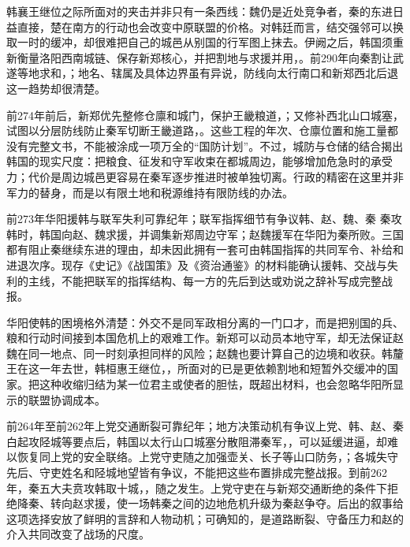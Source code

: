 韩襄王继位之际所面对的夹击并非只有一条西线：魏仍是近处竞争者，秦的东进日益直接，楚在南方的行动也会改变中原联盟的价格。对韩廷而言，结交强邻可以换取一时的缓冲，却很难把自己的城邑从别国的行军图上抹去。伊阙之后，韩国须重新衡量洛阳西南城链、保存新郑核心，并把割地与求援并用，。前290年向秦割让武遂等地求和，；地名、辖属及具体边界虽有异说，防线向太行南口和新郑西北后退这一趋势却很清楚。

前274年前后，新郑优先整修仓廪和城门，保护王畿粮道，；又修补西北山口城塞，试图以分层防线防止秦军切断王畿道路，。这些工程的年次、仓廪位置和施工量都没有完整文书，不能被涂成一项万全的“国防计划”。不过，城防与仓储的结合揭出韩国的现实尺度：把粮食、征发和守军收束在都城周边，能够增加危急时的承受力；代价是周边城邑更容易在秦军逐步推进时被单独切离。行政的精密在这里并非军力的替身，而是以有限土地和税源维持有限防线的办法。

\begin{event}{前273年}{华阳援韩与联军失利}{可靠纪年；联军指挥细节有争议}{韩、赵、魏、秦}
秦攻韩时，韩国向赵、魏求援，并调集新郑周边守军；赵魏援军在华阳为秦所败。三国都有阻止秦继续东进的理由，却未因此拥有一套可由韩国指挥的共同军令、补给和进退次序。现存《史记》《战国策》及《资治通鉴》的材料能确认援韩、交战与失利的主线，不能把联军的指挥结构、每一方的先后到达或劝说之辞补写成完整战报。
\end{event}

华阳使韩的困境格外清楚：外交不是同军政相分离的一门口才，而是把别国的兵、粮和行动时间接到本国危机上的艰难工作。新郑可以动员本地守军，却无法保证赵魏在同一地点、同一时刻承担同样的风险；赵魏也要计算自己的边境和收获。韩釐王在这一年去世，韩桓惠王继位，，所面对的已是更依赖割地和短暂外交缓冲的国家。把这种收缩归结为某一位君主或使者的胆怯，既超出材料，也会忽略华阳所显示的联盟协调成本。

\begin{event}{前264年至前262年}{上党交通断裂}{可靠纪年；地方决策动机有争议}{上党、韩、赵、秦}
白起攻陉城等要点后，韩国以太行山口城塞分散阻滞秦军，，可以延缓进逼，却难以恢复同上党的安全联络。上党守吏随之加强壶关、长子等山口防务，；各城失守先后、守吏姓名和陉城地望皆有争议，不能把这些布置排成完整战报。到前262年，秦五大夫贲攻韩取十城，，随之发生。上党守吏在与新郑交通断绝的条件下拒绝降秦、转向赵求援，使一场韩秦之间的边地危机升级为秦赵争夺。后出的叙事给这项选择安放了鲜明的言辞和人物动机；可确知的，是道路断裂、守备压力和赵的介入共同改变了战场的尺度。
\end{event}

